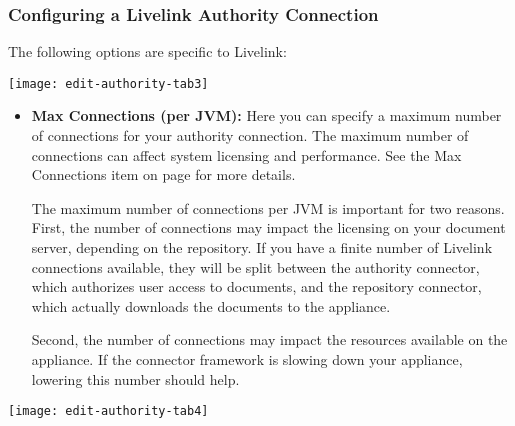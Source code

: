 %
%

\subsubsection{Configuring a Livelink Authority Connection}

The following options are specific to Livelink:

\texttt{[image: edit-authority-tab3]}

\begin{itemize} 

\item \textbf{Max Connections (per JVM):} Here you can specify a
maximum number of connections for your authority
connection. \ifCombinedConnectorGuide The maximum number of
connections can affect system licensing and performance. See the Max
Connections item on page \pageref{max-auth} for more details.\fi

\ifLivelinkGuide
The maximum number of connections per JVM is important for two reasons.
First, the number of connections may impact the licensing on your document
server, depending on the repository. If you have a finite number of
Livelink connections available, they will be split between the authority
connector, which authorizes user access to documents, and the repository
connector, which actually downloads the documents to the appliance.

Second, the number of connections may impact the resources
available on the appliance. If the connector framework is slowing down
your appliance, lowering this number should help.
\fi

\end{itemize}

\texttt{[image: edit-authority-tab4]}

